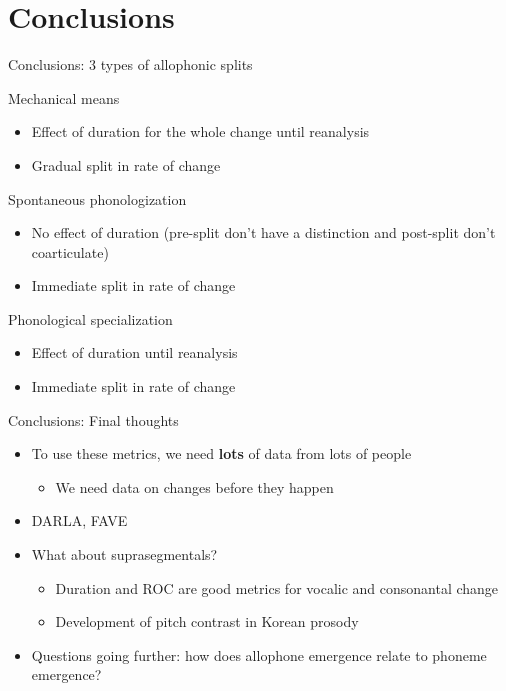 \documentclass[hyperref={pdfpagelabels=false}]{beamer}
\begin{document}
\section{Conclusions}

\begin{frame}{Conclusions: 3 types of allophonic splits}
	\begin{block}{Mechanical means}
		\begin{itemize}
			\item Effect of duration for the whole change until reanalysis
			\item Gradual split in rate of change \pause
		\end{itemize}
	\end{block}
	
	\begin{block}{Spontaneous phonologization}
		\begin{itemize}
			\item No effect of duration (pre-split don't have a distinction and post-split don't coarticulate)
			\item Immediate split in rate of change \pause
		\end{itemize}
	\end{block}
	
	\begin{block}{Phonological specialization}
		\begin{itemize}
			\item Effect of duration until reanalysis
			\item Immediate split in rate of change 
		\end{itemize}
	\end{block}
\end{frame}

\begin{frame}{Conclusions: Final thoughts}
	\begin{itemize}
		\item To use these metrics, we need \textbf{lots} of data from lots of people \pause
			\begin{itemize}
			\item We need data on changes before they happen \pause
			\end{itemize}
		\item DARLA, FAVE \pause
		\item What about suprasegmentals?
			\begin{itemize}
			\item Duration and ROC are good metrics for vocalic and consonantal change \pause
			\item \cite{Cho2015} Development of pitch contrast in Korean prosody \pause 
			\end{itemize}		
		\item Questions going further: how does allophone emergence relate to phoneme emergence?
	\end{itemize}
\end{frame}
\end{document}
